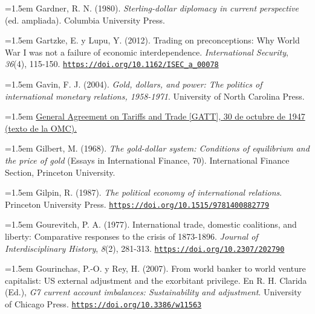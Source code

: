 \documentclass[10pt,a4paper]{article}
\begin{document}
{\sloppy\noindent\hangindent=1.5em Gardner, R. N. (1980). \textit{Sterling-dollar diplomacy in current perspective} (ed. ampliada). Columbia University Press.\par}

{\sloppy\noindent\hangindent=1.5em Gartzke, E. y Lupu, Y. (2012). Trading on preconceptions: Why World War I was not a failure of economic interdependence. \textit{International Security}, \textit{36}(4), 115-150. \href{https://doi.org/10.1162/ISEC_a_00078}{\nolinkurl{https://doi.org/10.1162/ISEC_a_00078}}\par}

{\sloppy\noindent\hangindent=1.5em Gavin, F. J. (2004). \textit{Gold, dollars, and power: The politics of international monetary relations, 1958-1971}. University of North Carolina Press.\par}

{\sloppy\noindent\hangindent=1.5em \href{https://www.wto.org/ENGLISH/docs_e/legal_e/gatt47_01_e.htm}{General Agreement on Tariffs and Trade [GATT], 30 de octubre de 1947 (texto de la OMC).}\par}

\noindent\hangindent=1.5em Gilbert, M. (1968). \textit{The gold-dollar system: Conditions of equilibrium and the price of gold} (Essays in International Finance, 70). International Finance Section, Princeton University.

{\sloppy\noindent\hangindent=1.5em Gilpin, R. (1987). \textit{The political economy of international relations}. Princeton University Press. \href{https://doi.org/10.1515/9781400882779}{\nolinkurl{https://doi.org/10.1515/9781400882779}}\par}

{\sloppy\noindent\hangindent=1.5em Gourevitch, P. A. (1977). International trade, domestic coalitions, and liberty: Comparative responses to the crisis of 1873-1896. \textit{Journal of Interdisciplinary History}, \textit{8}(2), 281-313. \href{https://doi.org/10.2307/202790}{\nolinkurl{https://doi.org/10.2307/202790}}\par}

{\sloppy\noindent\hangindent=1.5em Gourinchas, P.-O. y Rey, H. (2007). From world banker to world venture capitalist: US external adjustment and the exorbitant privilege. En R. H. Clarida (Ed.), \textit{G7 current account imbalances: Sustainability and adjustment}. University of Chicago Press. \href{https://doi.org/10.3386/w11563}{\nolinkurl{https://doi.org/10.3386/w11563}}\par}
\end{document}
